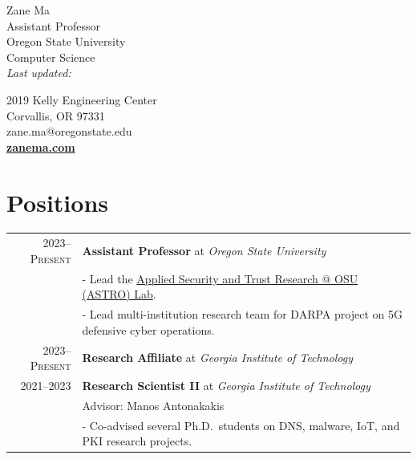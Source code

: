 \documentclass[10pt,singlecolumn]{article} %
\def\parsedate #1:20#2#3#4#5#6#7#8\empty{20#2#3/#4#5/#6#7}
\def\moddate#1{\expandafter\parsedate\pdffilemoddate{#1}\empty}
\begin{document}
\color{text1} %

\begin{minipage}[t]{0.5\textwidth}
{\Huge Zane Ma} \vspace{0.5cm}\\ %
Assistant Professor  \\
Oregon State University \\
Computer Science \\
\emph{Last updated: \moddate{\jobname.tex}}

\end{minipage}
\begin{minipage}[t]{0.5\textwidth}
\begin{flushright}
\vspace{\baselineskip}
2019 Kelly Engineering Center \\
Corvallis, OR 97331 \\
zane.ma@oregonstate.edu \\ 
\textbf{\href{https://zanema.com}{zanema.com}}
\end{flushright}
\end{minipage}





\vspace{0.3cm}
\section{Positions}

\begin{tabular}{rl}

2023--\textsc{Present} & \textbf{Assistant Professor} at \emph{Oregon State University}\\ 
	& - Lead the \href{https://astrolab.site}{Applied Security and Trust Research @ OSU (ASTRO) Lab}. \\
	& - Lead multi-institution research team for DARPA project on 5G defensive cyber operations.\\

2023--\textsc{Present} & \textbf{Research Affiliate} at \emph{Georgia Institute of Technology}\\
2021--\textsc{2023} & \textbf{Research Scientist II} at \emph{Georgia Institute of Technology}\\ 
& Advisor: Manos Antonakakis \\
& - Co-advised several Ph.D.\ students on DNS, malware, IoT, and PKI research projects. \\
\end{tabular}\\
\end{document}
